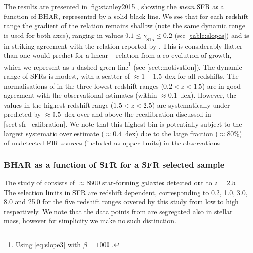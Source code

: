The results are presented in \cref{fig:stanley2015}, showing the
\textit{mean} SFR as a function of BHAR, represented by a solid black line. We
see that for each redshift range the gradient of the relation remains shallow
(note the same dynamic range is used for both axes), ranging in values $0.1
\leq \gamma_{\mathrm{S15}} \leq 0.2$ (see \cref{table:slopes}) and is in
striking agreement with the  relation reported by
\citet{Stanley2015}.  This is considerably flatter than one would predict for a
linear -- relation from a co-evolution of growth, which we
represent as a dashed green line\footnote{Using \cref{eq:slope3} with $\beta =
1000$ \citep{McConnellandMa2013}.} (see \cref{sect:motivation}). The dynamic
range of SFRs is modest, with a scatter of $\approx 1-1.5$~dex for all
redshifts.  The normalisations of  in the three lowest redshift ranges
($0.2 < z < 1.5$) are in good agreement with the observational estimates
(within $\approx 0.1$~dex).  However, the values in the highest redshift range
($1.5 < z < 2.5$) are systematically under predicted by $\approx 0.5$~dex over
and above the recalibration discussed in \cref{sect:sfr_calibration}. We note
that this highest bin is potentially subject to the largest systematic over
estimate ($\approx 0.4$~dex) due to the large fraction ($\approx 80$\%) of
undetected FIR sources (included as upper limits) in the observations
\citep[see][]{Stanley2015}.

\subsubsection{BHAR as a function of SFR for a SFR selected sample}

The study of \citet{Delvecchio2015} consists of $\approx 8600$ star-forming
galaxies detected out to $z=2.5$. The selection limits in SFR are redshift
dependent, corresponding to 0.2, 1.0, 3.0, 8.0 and 25.0 \Msolyr for the five
redshift ranges covered by this study from low to high respectively. We note
that the data points from \citet{Delvecchio2015} are segregated also in stellar
mass, however for simplicity we make no such distinction.


